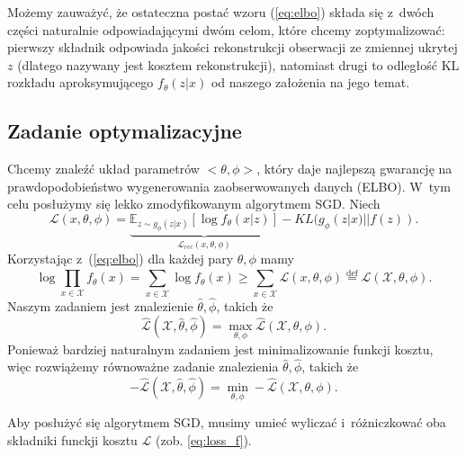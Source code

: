 \documentclass{iithesis}
\begin{document}
Możemy zauważyć, że ostateczna postać wzoru (\ref{eq:elbo})
składa się z~dwóch części naturalnie odpowiadającymi dwóm
celom, które chcemy zoptymalizować: pierwszy składnik odpowiada
jakości rekonstrukcji obserwacji ze zmiennej ukrytej $z$
(dlatego nazywany jest kosztem rekonstrukcji),
natomiast drugi to odległość KL rozkładu aproksymującego
$f_\theta(z|x)$ od naszego założenia na jego temat.

\subsection{Zadanie optymalizacyjne} \label{sec:optim_task}
Chcemy znaleźć układ parametrów $<\theta,\phi>$, który daje najlepszą
gwarancję na prawdopodobieństwo wygenerowania zaobserwowanych danych (ELBO).
W~tym celu posłużymy się lekko zmodyfikowanym algorytmem SGD.
Niech
\begin{equation} \label{eq:loss_f}
\mathcal{L}(x,\theta,\phi) =
\underbrace{\mathbb{E}_{z\sim g_\phi(z|x)}\left[\log f_\theta(x|z)\right]}_{\mathcal{L}_{rec}(x,\theta,\phi)} -
KL(g_\phi(z|x)||f(z)).
\end{equation}
Korzystając z~(\ref{eq:elbo}) dla każdej pary $\theta,\phi$ mamy
\begin{equation*}
\log \prod_{x \in \mathcal{X}} f_\theta(x) = \sum_{x \in \mathcal{X}} \log f_\theta(x) \geq
\sum_{x \in \mathcal{X}} \mathcal{L}(x,\theta,\phi) \overset{\mathrm{def}}{=} \hat{\mathcal{L}}(\mathcal{X},\theta,\phi).
\end{equation*}
Naszym zadaniem jest znalezienie $\hat{\theta},\hat{\phi}$, takich że
\begin{equation*}
\hat{\mathcal{L}}(\mathcal{X},\hat{\theta},\hat{\phi}) = \max_{\theta,\phi} \hat{\mathcal{L}}(\mathcal{X},\theta,\phi).
\end{equation*}
Ponieważ bardziej naturalnym zadaniem jest minimalizowanie funkcji kosztu,
więc rozwiążemy równoważne zadanie znalezienia $\hat{\theta},\hat{\phi}$, takich że
\begin{equation*}
-\hat{\mathcal{L}}(\mathcal{X},\hat{\theta},\hat{\phi}) = \min_{\theta,\phi} -\hat{\mathcal{L}}(\mathcal{X},\theta,\phi).
\end{equation*}

Aby posłużyć się algorytmem SGD, musimy umieć wyliczać i~różniczkować
oba składniki funckji kosztu $\mathcal{L}$ (zob. \ref{eq:loss_f}).
\end{document}
